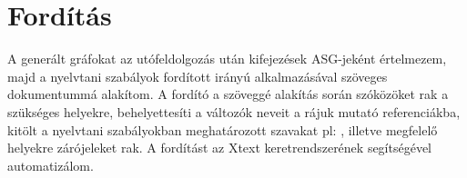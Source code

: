 \section{Fordítás}

A generált gráfokat az utófeldolgozás után kifejezések  ASG-jeként értelmezem, majd a nyelvtani szabályok fordított irányú alkalmazásával szöveges dokumentummá alakítom. A fordító a szöveggé alakítás során szóközöket rak a szükséges helyekre, behelyettesíti a változók neveit a rájuk mutató referenciákba,  kitölt a nyelvtani szabályokban meghatározott szavakat pl:  , illetve megfelelő helyekre  zárójeleket rak. A fordítást az Xtext keretrendszerének segítségével automatizálom.

